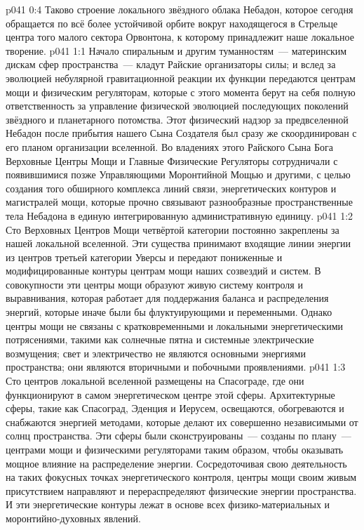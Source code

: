 \vs p041 0:4 Таково строение локального звёздного облака Небадон, которое сегодня обращается по всё более устойчивой орбите вокруг находящегося в Стрельце центра того малого сектора Орвонтона, к которому принадлежит наше локальное творение.
\vs p041 1:1 Начало спиральным и другим туманностям~--- материнским дискам сфер пространства~--- кладут Райские организаторы силы; и вслед за эволюцией небулярной гравитационной реакции их функции передаются центрам мощи и физическим регуляторам, которые с этого момента берут на себя полную ответственность за управление физической эволюцией последующих поколений звёздного и планетарного потомства. Этот физический надзор за предвселенной Небадон после прибытия нашего Сына Создателя был сразу же скоординирован с его планом организации вселенной. Во владениях этого Райского Сына Бога Верховные Центры Мощи и Главные Физические Регуляторы сотрудничали с появившимися позже Управляющими Моронтийной Мощью и другими, с целью создания того обширного комплекса линий связи, энергетических контуров и магистралей мощи, которые прочно связывают разнообразные пространственные тела Небадона в единую интегрированную административную единицу.
\vs p041 1:2 Сто Верховных Центров Мощи четвёртой категории постоянно закреплены за нашей локальной вселенной. Эти существа принимают входящие линии энергии из центров третьей категории Уверсы и передают пониженные и модифицированные контуры центрам мощи наших созвездий и систем. В совокупности эти центры мощи образуют живую систему контроля и выравнивания, которая работает для поддержания баланса и распределения энергий, которые иначе были бы флуктуирующими и переменными. Однако центры мощи не связаны с кратковременными и локальными энергетическими потрясениями, такими как солнечные пятна и системные электрические возмущения; свет и электричество не являются основными энергиями пространства; они являются вторичными и побочными проявлениями.
\vs p041 1:3 Сто центров локальной вселенной размещены на Спасограде, где они функционируют в самом энергетическом центре этой сферы. Архитектурные сферы, такие как Спасоград, Эденция и Иерусем, освещаются, обогреваются и снабжаются энергией методами, которые делают их совершенно независимыми от солнц пространства. Эти сферы были сконструированы~--- созданы по плану~--- центрами мощи и физическими регуляторами таким образом, чтобы оказывать мощное влияние на распределение энергии. Сосредоточивая свою деятельность на таких фокусных точках энергетического контроля, центры мощи своим живым присутствием направляют и перераспределяют физические энергии пространства. И эти энергетические контуры лежат в основе всех физико\hyp{}материальных и моронтийно\hyp{}духовных явлений.
